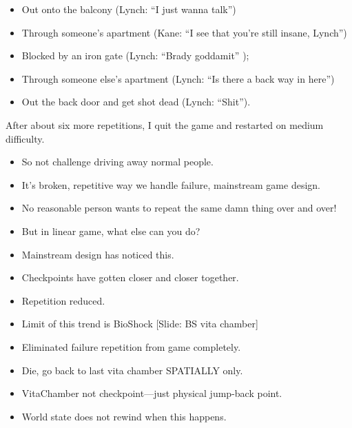 \documentclass[12pt]{article}
\begin{document}
{\begin{itemize}
\item Out onto the balcony (Lynch: ``I just wanna talk'')

\item Through someone's apartment (Kane: ``I see that you're still insane, Lynch'')

\item Blocked by an iron gate (Lynch: ``Brady goddamit'' );

\item Through someone else's apartment (Lynch: ``Is there a back way in here'')

\item Out the back door and get shot dead (Lynch:  ``Shit'').
\end{itemize} 

\noindent After about six more repetitions, I quit the game and restarted on medium difficulty.


\begin{itemize}


\item So not challenge driving away normal people.

\item It's broken, repetitive way we handle failure, mainstream game design.

\item No reasonable person wants to repeat the same damn thing over and over!

\item But in linear game, what else can you do?

\item Mainstream design has noticed this.

\item Checkpoints have gotten closer and closer together.

\item Repetition reduced.




\item Limit of this trend is BioShock [Slide: BS vita chamber]

\item Eliminated failure repetition from game completely.

\item Die, go back to last vita chamber SPATIALLY only.

\item VitaChamber not checkpoint---just physical jump-back point.

\item World state does not rewind when this happens.


\end{itemize}}
\end{document}
